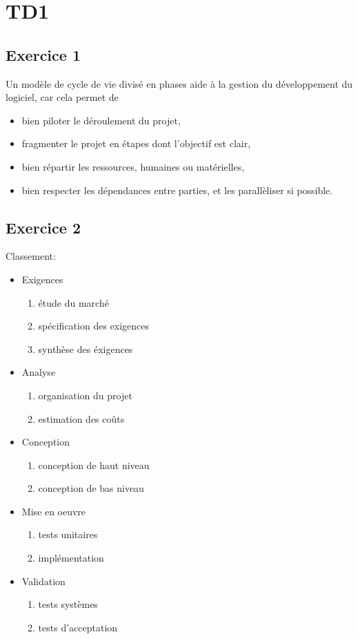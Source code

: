 \section{TD1}

\subsection{Exercice 1}
Un modèle de cycle de vie divisé en phases aide à la gestion du développement du logiciel, car cela permet de
\begin{itemize}
	\item bien piloter le déroulement du projet,
	\item fragmenter le projet en étapes dont l'objectif est clair,
	\item bien répartir les ressources, humaines ou matérielles,
	\item bien respecter les dépendances entre parties, et les parallèliser si possible.
\end{itemize}

\subsection{Exercice 2}
Classement:
\begin{itemize}
	\item Exigences
	\begin{enumerate}
		\item étude du marché
		\item spécification des exigences
		\item synthèse des éxigences
	\end{enumerate}
	\item Analyse
	\begin{enumerate}
		\item organisation du projet
		\item estimation des coûts
	\end{enumerate}
	\item Conception
	\begin{enumerate}
		\item conception de haut niveau
		\item conception de bas niveau
	\end{enumerate}
	\item Mise en oeuvre
	\begin{enumerate}
		\item tests unitaires
		\item implémentation
	\end{enumerate}
	\item Validation
	\begin{enumerate}
		\item tests systèmes
		\item tests d'acceptation
	\end{enumerate}
\end{itemize}

